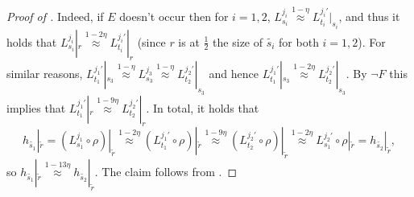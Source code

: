 \begin{proof}[Proof of ]
    Indeed, if \(E\) doesn't occur then for \(i=1,2\), \(L_{s_i}^{j_i} \overset{1-\eta}{\approx} L_{t_i}^{j_i'}|_{s_i}\),  and thus it holds that \(L_{s_i}^{j_i}|_r \overset{1-2\eta}{\approx} L_{t_i}^{j_i'}|_r\) (since \(r\) is at \(\frac{1}{2}\) the size of \(\tilde{s_i}\) for both \(i=1,2\)). For similar reasons, \(L_{t_1}^{j_1'}|_{s_3} \overset{1-\eta}{\approx} L_{s_3}^{j_3} \overset{1-\eta}{\approx} L_{t_2}^{j_2'}|_{s_3}\) and hence \(L_{t_1}^{j_1'}|_{s_3} \overset{1-2\eta}{\approx} L_{t_2}^{j_2'}|_{s_3}\). By \(\neg F\) this implies that \(L_{t_1}^{j_1'} |_r \overset{1-9\eta}{\approx} L_{t_2}^{j_2'}|_r\). In total, it holds that
    \[h_{\tilde{s_1}}|_{\tilde{r}} = (L_{s_1}^{j_1} \circ \rho)|_{\tilde{r}} \overset{1-2\eta}{\approx} (L_{t_1}^{j_1'} \circ \rho)|_{\tilde{r}} \overset{1-9\eta}{\approx} (L_{t_2}^{j_2'} \circ \rho)|_{\tilde{r}} \overset{1-2\eta}{\approx} L_{s_1}^{j_2'} \circ \rho|_{\tilde{r}} = h_{\tilde{s_2}}|_{\tilde{r}},\]
    so \(h_{\tilde{s_1}}|_{\tilde{r}} \overset{1-13\eta}{\approx} h_{\tilde{s_2}}|_{\tilde{r}}\). The claim follows from .
\end{proof}

